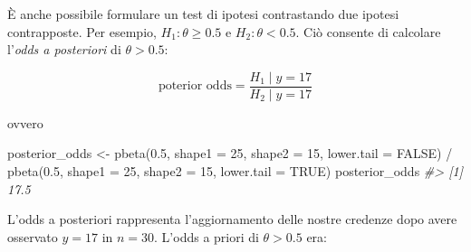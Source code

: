\documentclass[
  11pt,
]{krantz}
\makeatletter
\newenvironment{Shaded}{\begin{snugshade}}{\end{snugshade}}
\newcommand{\AttributeTok}[1]{\textcolor[rgb]{0.61,0.61,0.61}{#1}}
\newcommand{\CommentTok}[1]{\textcolor[rgb]{0.37,0.37,0.37}{\textit{#1}}}
\newcommand{\ConstantTok}[1]{\textcolor[rgb]{0,0,0}{#1}}
\newcommand{\ControlFlowTok}[1]{\textcolor[rgb]{0.27,0.27,0.27}{\textbf{#1}}}
\newcommand{\DecValTok}[1]{\textcolor[rgb]{0.06,0.06,0.06}{#1}}
\newcommand{\FloatTok}[1]{\textcolor[rgb]{0.06,0.06,0.06}{#1}}
\newcommand{\FunctionTok}[1]{\textcolor[rgb]{0,0,0}{#1}}
\newcommand{\NormalTok}[1]{#1}
\newcommand{\OtherTok}[1]{\textcolor[rgb]{0.37,0.37,0.37}{#1}}
\newcommand{\SpecialCharTok}[1]{\textcolor[rgb]{0,0,0}{#1}}
\newenvironment{kframe}{%
\medskip{}
\setlength{\fboxsep}{.8em}
 \def\at@end@of@kframe{}%
 \ifinner\ifhmode%
  \def\at@end@of@kframe{\end{minipage}}%
  \begin{minipage}{\columnwidth}%
 \fi\fi%
 \def\FrameCommand##1{\hskip\@totalleftmargin \hskip-\fboxsep
 \colorbox{shadecolor}{##1}\hskip-\fboxsep
     \hskip-\linewidth \hskip-\@totalleftmargin \hskip\columnwidth}%
 \MakeFramed {\advance\hsize-\width
   \@totalleftmargin\z@ \linewidth\hsize
   \@setminipage}}%
 {\par\unskip\endMakeFramed%
 \at@end@of@kframe}
\renewenvironment{Shaded}{\begin{kframe}}{\end{kframe}}
\theoremstyle{definition}
\theoremstyle{definition}
\theoremstyle{definition}
\theoremstyle{definition}
\theoremstyle{remark}
\makeatother
\begin{document}
\begin{Shaded}
\end{Shaded}

È anche possibile formulare un test di ipotesi contrastando due ipotesi contrapposte. Per esempio, \(H_1: \theta \geq 0.5\) e \(H_2: \theta < 0.5\). Ciò consente di calcolare l'\emph{odds a posteriori} di \(\theta > 0.5\):

\begin{equation}
\text{poterior odds} = \frac{H_1 \mid y = 17}{H_2 \mid y = 17}
\end{equation}

ovvero

\begin{Shaded}
\begin{Highlighting}[]
\NormalTok{posterior\_odds }\OtherTok{\textless{}{-}}
  \FunctionTok{pbeta}\NormalTok{(}\FloatTok{0.5}\NormalTok{, }\AttributeTok{shape1 =} \DecValTok{25}\NormalTok{, }\AttributeTok{shape2 =} \DecValTok{15}\NormalTok{, }\AttributeTok{lower.tail =} \ConstantTok{FALSE}\NormalTok{) }\SpecialCharTok{/}
    \FunctionTok{pbeta}\NormalTok{(}\FloatTok{0.5}\NormalTok{, }\AttributeTok{shape1 =} \DecValTok{25}\NormalTok{, }\AttributeTok{shape2 =} \DecValTok{15}\NormalTok{, }\AttributeTok{lower.tail =} \ConstantTok{TRUE}\NormalTok{)}
\NormalTok{posterior\_odds}
\CommentTok{\#\textgreater{} [1] 17.5}
\end{Highlighting}
\end{Shaded}

L'odds a posteriori rappresenta l'aggiornamento delle nostre credenze dopo avere osservato \(y = 17\) in \(n = 30\). L'odds a priori di \(\theta > 0.5\) era:
\end{document}
